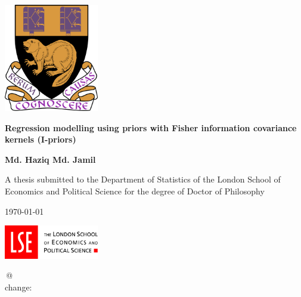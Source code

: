\documentclass[11pt,twoside,openright,showframe]{report}
\begin{document}
\begin{titlepage}
  \singlespacing
  \begin{center}
    
    \vspace*{6.25mm}
     
    \includegraphics[width=0.31\textwidth]{figure/lse_coat_of_arms_1024}
    \vspace{15.2mm}
    
    \LARGE
    {\textbf{Regression modelling using priors with Fisher information covariance kernels (I-priors)}}
    \vspace{12.16mm}  %
    
    \Large 
    \textbf{Md. Haziq Md. Jamil}
    \vfill
    
    \normalsize
    A thesis submitted to the Department of Statistics of the London School of Economics and Political Science for the degree of Doctor of Philosophy
    \vspace{1cm}
    
    \UKvardate
    \today
    \vspace{1cm}
    
    \includegraphics[width=0.31\textwidth]{figure/lse_logo_1024}
  
  \end{center}
\end{titlepage}

\begin{center}
  \vspace*{1cm}
  
  \vfill
  
  \begingroup
    \singlespacing
    \color{grymath}
    \ttfamily 
    [git]\;\gitBranch\,@\,\gitAbbrevHash{} \\[-0.3em]
    change:\;\gitAuthorIsoDate
  \endgroup
\end{center}
\end{document}
